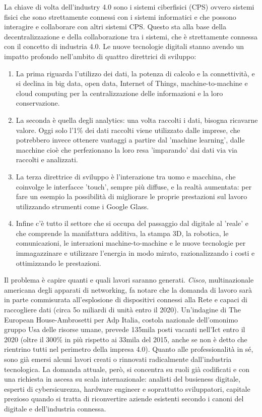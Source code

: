 \documentclass[12pt, a4paper, oneside]{book}
\begin{document}
La chiave di volta dell'industry 4.0 sono i sistemi ciberfisici (CPS) ovvero sistemi fisici che sono strettamente connessi con i sistemi informatici e che possono interagire e collaborare con altri sistemi CPS. Questo sta alla base della decentralizzazione e della collaborazione tra i sistemi, che è strettamente connessa con il concetto di industria 4.0.
Le nuove tecnologie digitali stanno avendo un impatto profondo nell'ambito di quattro direttrici di sviluppo: 
\begin{enumerate}
	\item La prima riguarda l'utilizzo dei dati, la potenza di calcolo e la connettività, e si declina in big data, open data, Internet of Things, machine-to-machine e cloud computing per la centralizzazione delle informazioni e la loro conservazione.
	\item La seconda è quella degli analytics: una volta raccolti i dati, bisogna ricavarne valore. Oggi solo l'1\% dei dati raccolti viene utilizzato dalle imprese, che potrebbero invece ottenere vantaggi a partire dal 'machine learning', dalle macchine cioè che perfezionano la loro resa 'imparando' dai dati via via raccolti e analizzati.
	\item La terza direttrice di sviluppo è l'interazione tra uomo e macchina, che coinvolge le interfacce 'touch', sempre più diffuse, e la realtà aumentata: per fare un esempio la possibilità di migliorare le proprie prestazioni sul lavoro utilizzando strumenti come i Google Glass.
	\item Infine c'è tutto il settore che si occupa del passaggio dal digitale al 'reale' e che comprende la manifattura additiva, la stampa 3D, la robotica, le comunicazioni, le interazioni machine-to-machine e le nuove tecnologie per immagazzinare e utilizzare l'energia in modo mirato, razionalizzando i costi e ottimizzando le prestazioni.
\end{enumerate} 
Il problema è capire quanti e quali lavori saranno generati. \textit{Cisco}, multinazionale americana degli apparati di networking, fa notare che la domanda di lavoro sarà in parte commisurata all'esplosione di dispositivi connessi alla Rete e capaci di raccogliere dati (circa 5o miliardi di unità entro il 2020). Un'indagine di The European House-Ambrosetti per Adp Italia, costola nazionale dell'omonimo gruppo Usa delle risorse umane, prevede 135mila posti vacanti nell'Ict entro il 2020 (oltre il 300\% in più rispetto ai 33mila del 2015, anche se non è detto che rientrino tutti nel perimetro della impresa 4.0). Quanto alle professionalità in sé, sono già emersi alcuni lavori creati o rinnovati radicalmente dall'industria tecnologica. La domanda attuale, però, si concentra su ruoli già codificati e con una richiesta in ascesa su scala internazionale: analisti del busieness digitale, esperti di cybersicurezza, hardware engineer e soprattutto sviluppatori, capitale prezioso quando si tratta di riconvertire aziende esistenti secondo i canoni del digitale e dell'industria connessa.
\end{document}
